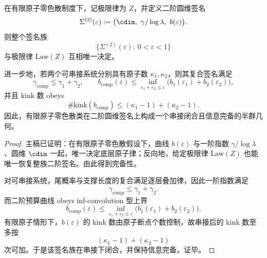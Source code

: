 \begin{theorem}[二阶圆维签名的串接完备性]\label{thm:conclusion-second-order-circle-dimension-signature-concatenation-completeness}
在有限原子零色散制度下，记极限律为 \(Z\)，并定义二阶圆维签名
\[
\Sigma^{(2)}(\varepsilon):=
\bigl(\cdim,\ \gamma/\log\lambda,\ b(\varepsilon)\bigr).
\]
则整个签名族
\[
\bigl\{\Sigma^{(2)}(\varepsilon):\ 0<\varepsilon<1\bigr\}
\]
与极限律 \(\mathrm{Law}(Z)\) 互相唯一决定。

进一步地，若两个可串接系统分别具有原子数 \(\kappa_1,\kappa_2\)，则其复合签名满足
\[
\gamma_{\mathrm{comp}}\le \gamma_1+\gamma_2,
\qquad
b_{\mathrm{comp}}(\varepsilon)\le
\inf_{\varepsilon_1+\varepsilon_2\le \varepsilon}
\bigl(b_1(\varepsilon_1)+b_2(\varepsilon_2)\bigr),
\]
并且 kink 数 obeys
\[
\#\mathrm{kink}(b_{\mathrm{comp}})
\le
(\kappa_1-1)+(\kappa_2-1).
\]
因此，有限原子零色散类在二阶圆维签名上构成一个串接闭合且信息完备的半群几何。
\end{theorem}
\begin{proof}
主稿已证明：在有限原子零色散假设下，曲线 \(b(\varepsilon)\) 与一阶指数 \(\gamma/\log\lambda\)、圆维 \(\cdim\) 一起，唯一决定底层原子律；反向地，给定极限律 \(\mathrm{Law}(Z)\) 也能唯一恢复整族二阶签名。由此得到完备性。

对可串接系统，尾概率与支撑长度的复合满足逐层叠加律，因此一阶指数满足
\[
\gamma_{\mathrm{comp}}\le \gamma_1+\gamma_2.
\]
而二阶预算曲线 obeys inf-convolution 型上界
\[
b_{\mathrm{comp}}(\varepsilon)\le
\inf_{\varepsilon_1+\varepsilon_2\le \varepsilon}
\bigl(b_1(\varepsilon_1)+b_2(\varepsilon_2)\bigr).
\]
有限原子情形下，\(b(\varepsilon)\) 的 kink 数由原子断点个数控制，故串接后的 kink 数至多按
\[
(\kappa_1-1)+(\kappa_2-1)
\]
次可加。于是该签名族在串接下闭合，并保持信息完备。证毕。
\end{proof}

